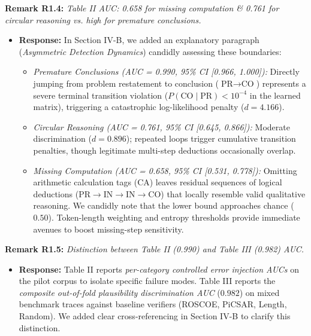 \documentclass[11pt,a4paper]{article}
\begin{document}
\vspace{6pt}
\noindent\textbf{Remark R1.4:} \textit{Table II AUC: 0.658 for missing computation \& 0.761 for circular reasoning vs. high for premature conclusions.}
\begin{itemize}[leftmargin=18pt]
    \item \textbf{Response:} In Section IV-B, we added an explanatory paragraph (\textit{Asymmetric Detection Dynamics}) candidly assessing these boundaries:
    \begin{itemize}
        \item \textit{Premature Conclusions (AUC = 0.990, 95\% CI [0.966, 1.000]):} Directly jumping from problem restatement to conclusion ($\text{PR}\to\text{CO}$) represents a severe terminal transition violation ($P(\text{CO}\mid\text{PR}) < 10^{-4}$ in the learned matrix), triggering a catastrophic log-likelihood penalty ($d=4.166$).
        \item \textit{Circular Reasoning (AUC = 0.761, 95\% CI [0.645, 0.866]):} Moderate discrimination ($d=0.896$); repeated loops trigger cumulative transition penalties, though legitimate multi-step deductions occasionally overlap.
        \item \textit{Missing Computation (AUC = 0.658, 95\% CI [0.531, 0.778]):} Omitting arithmetic calculation tags ($\text{CA}$) leaves residual sequences of logical deductions ($\text{PR}\to\text{IN}\to\text{IN}\to\text{CO}$) that locally resemble valid qualitative reasoning. We candidly note that the lower bound approaches chance ($0.50$). Token-length weighting and entropy thresholds provide immediate avenues to boost missing-step sensitivity.
    \end{itemize}
\end{itemize}

\vspace{6pt}
\noindent\textbf{Remark R1.5:} \textit{Distinction between Table II (0.990) and Table III (0.982) AUC.}
\begin{itemize}[leftmargin=18pt]
    \item \textbf{Response:} Table II reports \textit{per-category controlled error injection AUCs} on the pilot corpus to isolate specific failure modes. Table III reports the \textit{composite out-of-fold plausibility discrimination AUC} ($0.982$) on mixed benchmark traces against baseline verifiers (ROSCOE, PiCSAR, Length, Random). We added clear cross-referencing in Section IV-B to clarify this distinction.
\end{itemize}
\end{document}
